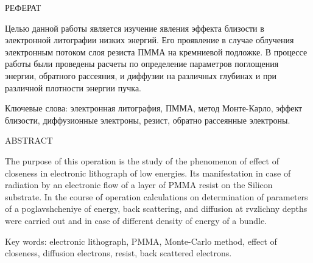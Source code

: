 \begin{center}
РЕФЕРАТ
\end{center}

Целью данной работы является изучение явления эффекта близости в электронной литографии низких энергий.
Его проявление в случае облучения электронным потоком слоя резиста ПММА на кремниевой подложке. В процессе работы были проведены расчеты по определение параметров поглощения энергии, обратного рассеяния, и диффузии на различных глубинах и при различной плотности энергии пучка.
\vspace*{1cm}

\hspace{-1.25cm}Ключевые слова: электронная литография, ПММА, метод Монте-Карло, эффект близости, диффузионные электроны, резист, обратно рассеянные электроны.
 \vspace*{1cm}

\begin{center}
ABSTRACT
\end{center}

The purpose of this operation is the study of the phenomenon of effect of closeness in electronic lithograph of low energies.
Its manifestation in case of radiation by an electronic flow of a layer of PMMA resist on the Silicon substrate. In the course of operation calculations on determination of parameters of a poglavshcheniye of energy, back scattering, and diffusion at rvzlichny depths were carried out and in case of different density of energy of a bundle.
\vspace*{1cm}

\hspace{-1.25cm}Key words: electronic lithograph, PMMA, Monte-Carlo method, effect of closeness, diffusion electrons, resist, back scattered electrons.
